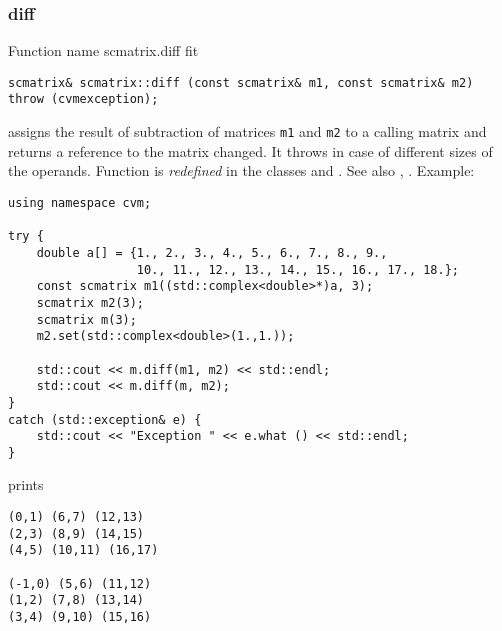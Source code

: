 \subsubsection{diff}
Function%
\pdfdest name {scmatrix.diff} fit
\begin{verbatim}
scmatrix& scmatrix::diff (const scmatrix& m1, const scmatrix& m2)
throw (cvmexception);
\end{verbatim}
assigns the result of subtraction of
matrices \verb"m1" and \verb"m2" to a calling matrix
and returns a reference to
the matrix changed.
It throws  
in case of different sizes of the operands.
Function is \emph{redefined} in the classes
and .
See also ,
.
Example:
\begin{Verbatim}
using namespace cvm;

try {
    double a[] = {1., 2., 3., 4., 5., 6., 7., 8., 9.,
                  10., 11., 12., 13., 14., 15., 16., 17., 18.};
    const scmatrix m1((std::complex<double>*)a, 3);
    scmatrix m2(3);
    scmatrix m(3);
    m2.set(std::complex<double>(1.,1.));

    std::cout << m.diff(m1, m2) << std::endl;
    std::cout << m.diff(m, m2);
}
catch (std::exception& e) {
    std::cout << "Exception " << e.what () << std::endl;
}
\end{Verbatim}
prints
\begin{Verbatim}
(0,1) (6,7) (12,13)
(2,3) (8,9) (14,15)
(4,5) (10,11) (16,17)

(-1,0) (5,6) (11,12)
(1,2) (7,8) (13,14)
(3,4) (9,10) (15,16)
\end{Verbatim}
\newpage



